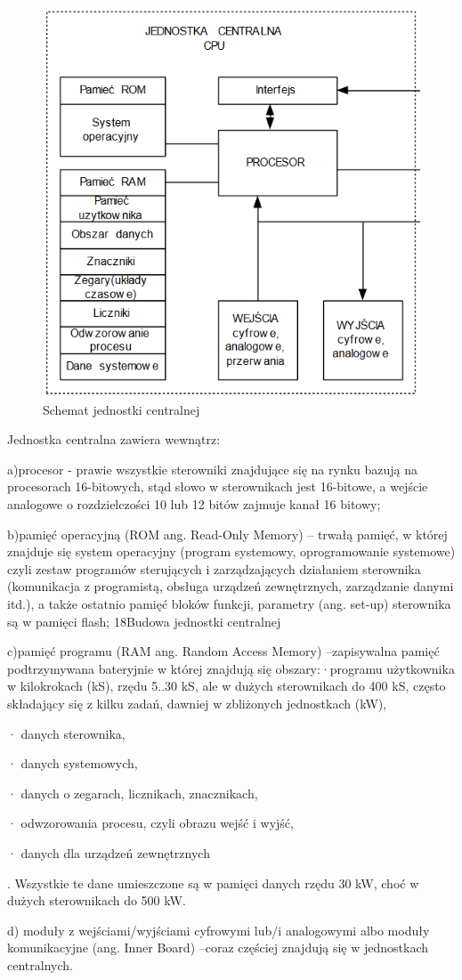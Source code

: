 \documentclass{article}
\begin{document}
	\begin{figure}[!htb]
		\centering
		\includegraphics[width=0.7\linewidth]{cpu}
		\caption{Schemat jednostki centralnej}
		\label{fig:cpu}
	\end{figure}
	
	Jednostka centralna zawiera wewnątrz:
	
	a)procesor - prawie wszystkie sterowniki znajdujące się na rynku bazują na procesorach 16-bitowych, stąd słowo w sterownikach jest 16-bitowe, a wejście analogowe o rozdzielczości 10 lub 12 bitów zajmuje kanał 16 bitowy;
	
	b)pamięć operacyjną (ROM ang. Read-Only Memory) – trwałą pamięć, w której znajduje się system operacyjny (program systemowy, oprogramowanie systemowe) czyli zestaw programów sterujących i zarządzających działaniem sterownika (komunikacja z programistą, obsługa urządzeń zewnętrznych, zarządzanie danymi itd.), a także ostatnio pamięć bloków funkcji, parametry (ang. set-up) sterownika są w pamięci flash;
	18Budowa jednostki centralnej
	
	c)pamięć programu (RAM ang. Random Access Memory) –zapisywalna pamięć podtrzymywana bateryjnie w której znajdują się obszary:·programu użytkownika w kilokrokach (kS), rzędu 5..30 kS, ale w dużych sterownikach do 400 kS, często składający się z kilku zadań, dawniej w zbliżonych jednostkach (kW),
	
	· danych sterownika,
	
	· danych systemowych,
	
	· danych o zegarach, licznikach, znacznikach,
	
	· odwzorowania procesu, czyli obrazu wejść i wyjść,
	
	· danych dla urządzeń zewnętrznych
	
	. Wszystkie te dane umieszczone są w pamięci danych rzędu 30 kW, choć w dużych sterownikach do 500 kW.
	
	d) moduły z wejściami/wyjściami cyfrowymi lub/i analogowymi albo moduły komunikacyjne (ang. Inner Board) –coraz częściej znajdują się w jednostkach centralnych.
	
\label{LastPage}
\end{document}
